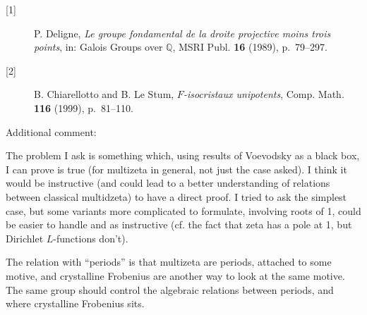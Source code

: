\documentclass[12pt,leqno]{article}
\newcommand{\dbQ}{{\mathbb{Q}}}
\newcommand{\dspace}{\lineskip=2pt
     \baselineskip=18pt\lineskiplimit=0pt}
\begin{document}
\bigskip
\begin{description}
\item[{[1]}]
P. Deligne,
{\it Le groupe fondamental de la droite
projective moins trois points},
in: Galois Groups over $\dbQ$, MSRI Publ. {\bf
16} (1989), p.~79--297.

\smallskip
\item[{[2]}]
B. Chiarellotto and B. Le Stum,
{\it $F$-isocristaux unipotents},
Comp. Math. {\bf 116} (1999), p.~81--110.
\end{description}

\bigskip
\dspace
\noindent
{\sectionfont Additional comment:}

The problem I ask is something which, using
results of Voevodsky as a black box, I can
prove is true (for multizeta in general, not
just the case asked). I think it would be
instructive (and could lead to a better
understanding of relations between classical
multidzeta) to have a direct proof. I tried to
ask the simplest case, but some variants more
complicated to formulate, involving roots of
1, could be easier to handle and as
instructive (cf. the fact that zeta has a pole
at 1, but Dirichlet $L$-functions don't).


The relation with ``periods'' is that
multizeta are periods, attached to some
motive, and crystalline Frobenius are another
way to look at the same motive. The same group
should control the algebraic relations between
periods, and where crystalline Frobenius sits.
\end{document}
